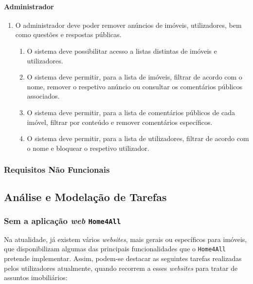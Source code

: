 \paragraph{Administrador}
\begin{enumerate}
    \item O administrador deve poder remover anúncios de imóveis, utilizadores, bem como questões e respostas públicas.
    \begin{enumerate}
        \item O sistema deve possibilitar acesso a listas distintas de imóveis e utilizadores.
        \item O sistema deve permitir, para a lista de imóveis, filtrar de acordo com o nome, remover o respetivo anúncio ou consultar os comentários públicos associados.
        \item O sistema deve permitir, para a lista de comentários públicos de cada imóvel, filtrar por conteúdo e remover comentários específicos.
        \item O sistema deve permitir, para a lista de utilizadores, filtrar de acordo com o nome e bloquear o respetivo utilizador.
    \end{enumerate}
\end{enumerate}

\subsubsection{Requisitos Não Funcionais}




\subsection{Análise e Modelação de Tarefas}

\subsubsection{Sem a aplicação \textit{web} \texttt{Home4All}}

Na atualidade, já existem vários \textit{websites}, mais gerais ou específicos para imóveis, que disponibilizam algumas das principais funcionalidades que o \texttt{Home4All} pretende implementar. Assim, podem-se destacar as seguintes tarefas realizadas pelos utilizadores atualmente, quando recorrem a esses \textit{websites} para tratar de assuntos imobiliários:

